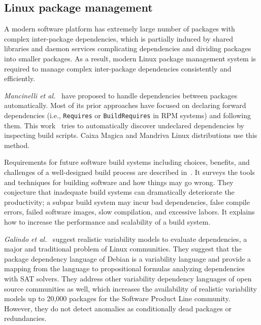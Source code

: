 
\subsection{Linux package management}

A modern software platform has extremely large number of packages with complex inter-package dependencies, which is partially induced by shared libraries and daemon services complicating dependencies and dividing packages into smaller packages.
As a result, modern Linux package management system is required to manage complex inter-package dependencies consistently and efficiently.


\textit{Mancinelli et al.}~\cite{11Mancinelli2006ASE} have proposed to handle dependencies between packages automatically.
Most of its prior approaches have focused on declaring forward dependencies (i.e., \texttt{Requires} or \texttt{BuildRequires} in RPM systems) and following them.
This work~\cite{11Mancinelli2006ASE} tries to automatically discover undeclared dependencies by inspecting build scripts.
Caixa Magica and Mandriva Linux distributions use this method.


Requirements for future software build systems including choices, benefits, and challenges of a well-designed build process are described in~\cite{12Smith2011SBSBook}.
It surveys the tools and techniques for building software and how things may go wrong.
They conjecture that inadequate build systems can dramatically deteriorate the productivity; a subpar build system may incur bad dependencies, false compile errors, failed software images, slow compilation, and excessive labors.
It explains how to increase the performance and scalability of a build system. 


\textit{Galindo et al.}~\cite{13Galindo2010DebianPR} suggest realistic variability models to evaluate dependencies, a major and traditional problem of Linux communities.
They suggest that the package dependency language of Debian is a variability language and provide a mapping from the language to propositional formulas analyzing dependencies with SAT solvers.
They address other variability dependency languages of open source communities as well, which increases the availability of realistic variability models up to 20,000 packages for the Software Product Line community.
However, they do not detect anomalies as conditionally dead packages or redundancies.


